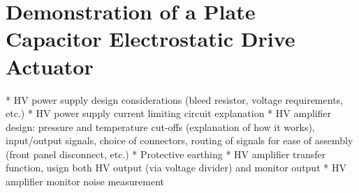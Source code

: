 \chapter{Demonstration of a Plate Capacitor Electrostatic Drive Actuator}
\label{c:esd-concept}

* HV power supply design considerations (bleed resistor, voltage requirements, etc.)
* HV power supply current limiting circuit explanation
* HV amplifier design: pressure and temperature cut-offs (explanation of how it works), input/output signals, choice of connectors, routing of signals for ease of assembly (front panel disconnect, etc.)
* Protective earthing
* HV amplifier transfer function, usign both HV output (via voltage divider) and monitor output
* HV amplifier monitor noise measurement